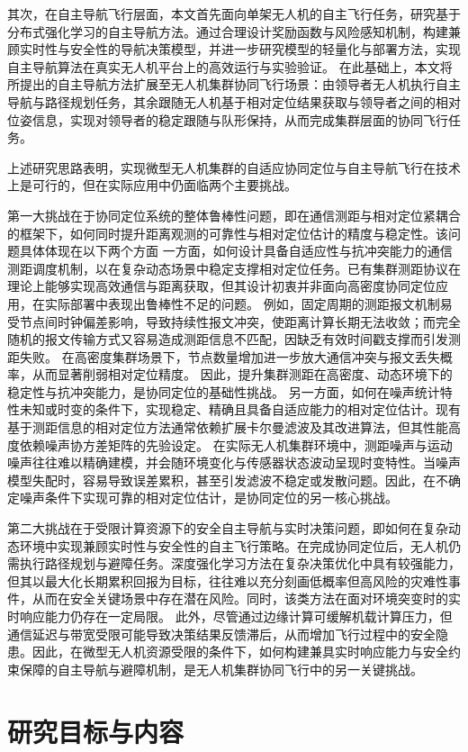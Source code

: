 其次，在自主导航飞行层面，本文首先面向单架无人机的自主飞行任务，研究基于分布式强化学习的自主导航方法。通过合理设计奖励函数与风险感知机制，构建兼顾实时性与安全性的导航决策模型，并进一步研究模型的轻量化与部署方法，实现自主导航算法在真实无人机平台上的高效运行与实验验证。
在此基础上，本文将所提出的自主导航方法扩展至无人机集群协同飞行场景：由领导者无人机执行自主导航与路径规划任务，其余跟随无人机基于相对定位结果获取与领导者之间的相对位姿信息，实现对领导者的稳定跟随与队形保持，从而完成集群层面的协同飞行任务。

上述研究思路表明，实现微型无人机集群的自适应协同定位与自主导航飞行在技术上是可行的，但在实际应用中仍面临两个主要挑战。

第一大挑战在于协同定位系统的整体鲁棒性问题，即在通信测距与相对定位紧耦合的框架下，如何同时提升距离观测的可靠性与相对定位估计的精度与稳定性。该问题具体体现在以下两个方面
一方面，如何设计具备自适应性与抗冲突能力的通信测距调度机制，以在复杂动态场景中稳定支撑相对定位任务。已有集群测距协议在理论上能够实现高效通信与距离获取，但其设计初衷并非面向高密度协同定位应用，在实际部署中表现出鲁棒性不足的问题。
例如，固定周期的测距报文机制易受节点间时钟偏差影响，导致持续性报文冲突，使距离计算长期无法收敛；而完全随机的报文传输方式又容易造成测距信息不匹配，因缺乏有效时间戳支撑而引发测距失败。
在高密度集群场景下，节点数量增加进一步放大通信冲突与报文丢失概率，从而显著削弱相对定位精度。
因此，提升集群测距在高密度、动态环境下的稳定性与抗冲突能力，是协同定位的基础性挑战。
另一方面，如何在噪声统计特性未知或时变的条件下，实现稳定、精确且具备自适应能力的相对定位估计。现有基于测距信息的相对定位方法通常依赖扩展卡尔曼滤波及其改进算法，但其性能高度依赖噪声协方差矩阵的先验设定。
在实际无人机集群环境中，测距噪声与运动噪声往往难以精确建模，并会随环境变化与传感器状态波动呈现时变特性。当噪声模型失配时，容易导致误差累积，甚至引发滤波不稳定或发散问题。因此，在不确定噪声条件下实现可靠的相对定位估计，是协同定位的另一核心挑战。

第二大挑战在于受限计算资源下的安全自主导航与实时决策问题，即如何在复杂动态环境中实现兼顾实时性与安全性的自主飞行策略。在完成协同定位后，无人机仍需执行路径规划与避障任务。深度强化学习方法在复杂决策优化中具有较强能力，但其以最大化长期累积回报为目标，往往难以充分刻画低概率但高风险的灾难性事件，从而在安全关键场景中存在潜在风险。同时，该类方法在面对环境突变时的实时响应能力仍存在一定局限。
此外，尽管通过边缘计算可缓解机载计算压力，但通信延迟与带宽受限可能导致决策结果反馈滞后，从而增加飞行过程中的安全隐患。因此，在微型无人机资源受限的条件下，如何构建兼具实时响应能力与安全约束保障的自主导航与避障机制，是无人机集群协同飞行中的另一关键挑战。
\section{研究目标与内容}

